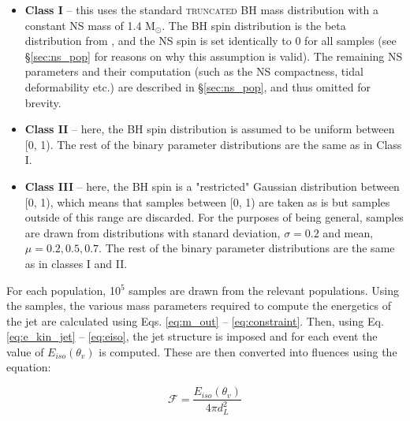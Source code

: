     \begin{itemize}

        \item \textbf{Class I} -- this uses the standard \textsc{truncated} BH mass
            distribution with a constant NS mass of 1.4 M$_\odot$. The BH spin
            distribution is the beta distribution from \cite{abbott_2020B}, and the NS
            spin is set identically to 0 for all samples (see \S\ref{sec:ns_pop}
            for reasons on why this assumption is valid). The remaining NS parameters
            and their computation (such as the NS compactness, tidal deformability etc.)
            are described in \S\ref{sec:ns_pop}, and thus omitted for brevity.

        \item \textbf{Class II} -- here, the BH spin distribution is assumed to be
            uniform between [0, 1). The rest of the binary parameter distributions are
            the same as in Class I.

        \item \textbf{Class III} -- here, the BH spin is a "restricted" Gaussian
            distribution between [0, 1), which means that samples between [0, 1) are
            taken as is but samples outside of this range are discarded.  For the
            purposes of being general, samples are drawn from distributions with stanard
            deviation, $\sigma = 0.2$ and mean, $\mu = 0.2, 0.5, 0.7$.  The rest of the
            binary parameter distributions are the same as in classes I and II.

    \end{itemize}

    For each population, 10$^5$ samples are drawn from the relevant populations. Using
    the samples, the various mass parameters required to compute the energetics of the
    jet are calculated using Eqs. \ref{eq:m_out} -- \ref{eq:constraint}. Then, using Eq.
    \ref{eq:e_kin_jet} -- \ref{eq:eiso}, the jet structure is imposed and for each event
    the value of $E_{iso}(\theta_v)$ is computed. These are then converted into fluences
    using the equation:

    \begin{equation}
        \mathcal{F} = \dfrac{E_{iso}(\theta_v)}{4\pi d_L^2}
    \end{equation}

